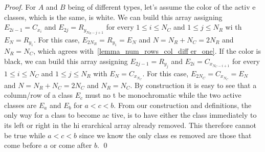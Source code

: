 \begin{proof}
For $A$ and $B$ being of different types, let's assume the color of the activ
e classes, which is the same, is white.
We can build this array assigning $E_{2i - 1} = C_{x_{i}}$ and $E_{2j} = R_{
y_{N_{R}-j+1}}$ for every $1 \leq i \leq N_{C}$ and $1 \leq j \leq N_{R}$ wi
th $E_{N} = R_{y_{1}}$.
For this case, $E_{2N_{R}} = R_{y_{1}} = E_{N}$ and $N = N_{R} + N_{C} = 2N_
{R}$ and $N_{R} = N_{C}$, which agrees with~\autoref{lemma_num_rows_col_diff
er_one}.
If the color is black, we can build this array assigning $E_{2j - 1} = R_{y_
{j}}$ and $E_{2i} = C_{x_{N_{C}-i+1}}$ for every $1 \leq i \leq N_{C}$ and $
1 \leq j \leq N_{R}$ with $E_{N} = C_{x_{N_{C}}}$.
For this case, $E_{2N_{C}} = C_{x_{N_{C}}} = E_{N}$ and $N = N_{R} + N_{C} =
 2N_{C}$ and $N_{R} = N_{C}$.
By construction it is easy to see that a column/row of a class $E_c$ must no
t be monochromatic while the two active classes are $E_a$ and $E_b$ for $a <
 c < b$.
From our construction and definitions, the only way for a class to become ac
tive, is to have either the class immediately to its left or right in the hi
erarchical array already removed.
This therefore cannot be true while $a < c < b$ since we know the only class
es removed are those that come before $a$ or come after $b$.
\qed
\end{proof}

